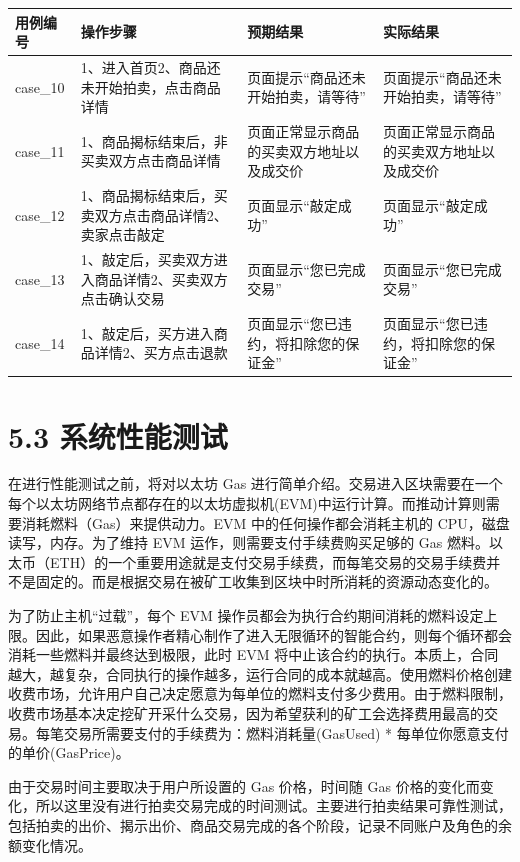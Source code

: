 \documentclass[
  10
]{article}
\newcounter{none} %
\begin{document}
{\def\LTcaptype{none} %
\begin{longtable}[]{@{}|l|l|l|l|@{}}
\toprule\noalign{}
\endhead
\bottomrule\noalign{}
\endlastfoot
\hline
用例编号 & 操作步骤 & 预期结果 & 实际结果 \\
\hline
case\_10 & 1、进入首页2、商品还未开始拍卖，点击商品详情 &
页面提示``商品还未开始拍卖，请等待'' &
页面提示``商品还未开始拍卖，请等待'' \\
\hline
case\_11 & 1、商品揭标结束后，非买卖双方点击商品详情 &
页面正常显示商品的买卖双方地址以及成交价 &
页面正常显示商品的买卖双方地址以及成交价 \\
\hline
case\_12 & 1、商品揭标结束后，买卖双方点击商品详情2、卖家点击敲定 &
页面显示``敲定成功'' & 页面显示``敲定成功'' \\
\hline
case\_13 & 1、敲定后，买卖双方进入商品详情2、买卖双方点击确认交易 &
页面显示``您已完成交易'' & 页面显示``您已完成交易'' \\
\hline
case\_14 & 1、敲定后，买方进入商品详情2、买方点击退款 &
页面显示``您已违约，将扣除您的保证金'' &
页面显示``您已违约，将扣除您的保证金'' \\
\hline
\end{longtable}
}

\section{5.3 系统性能测试}\label{ux7cfbux7edfux6027ux80fdux6d4bux8bd5}

在进行性能测试之前，将对以太坊 Gas
进行简单介绍。交易进入区块需要在一个每个以太坊网络节点都存在的以太坊虚拟机(EVM)中运行计算。而推动计算则需要消耗燃料（Gas）来提供动力。EVM
中的任何操作都会消耗主机的 CPU，磁盘读写，内存。为了维持 EVM
运作，则需要支付手续费购买足够的 Gas
燃料。以太币（ETH）的一个重要用途就是支付交易手续费，而每笔交易的交易手续费并不是固定的。而是根据交易在被矿工收集到区块中时所消耗的资源动态变化的。

为了防止主机``过载''，每个 EVM
操作员都会为执行合约期间消耗的燃料设定上限。因此，如果恶意操作者精心制作了进入无限循环的智能合约，则每个循环都会消耗一些燃料并最终达到极限，此时
EVM
将中止该合约的执行。本质上，合同越大，越复杂，合同执行的操作越多，运行合同的成本就越高。使用燃料价格创建收费市场，允许用户自己决定愿意为每单位的燃料支付多少费用。由于燃料限制，收费市场基本决定挖矿开采什么交易，因为希望获利的矿工会选择费用最高的交易。每笔交易所需要支付的手续费为：燃料消耗量(GasUsed)
* 每单位你愿意支付的单价(GasPrice)。

由于交易时间主要取决于用户所设置的 Gas 价格，时间随 Gas
价格的变化而变化，所以这里没有进行拍卖交易完成的时间测试。主要进行拍卖结果可靠性测试，包括拍卖的出价、揭示出价、商品交易完成的各个阶段，记录不同账户及角色的余额变化情况。
\end{document}
